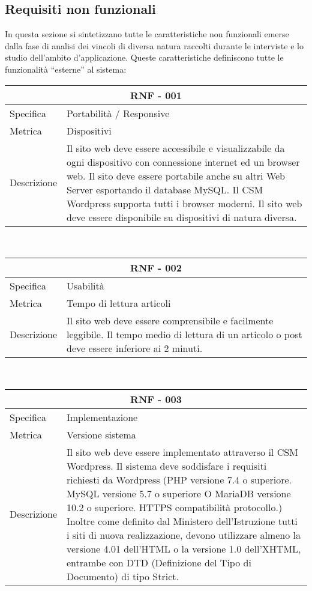 \documentclass{article}
\begin{document}
\subsection{\textbf{Requisiti non funzionali}}
In questa sezione si sintetizzano tutte le caratteristiche non funzionali emerse dalla fase di  analisi dei vincoli di diversa natura raccolti durante le interviste e lo studio dell'ambito d'applicazione. Queste caratteristiche definiscono tutte le funzionalità “esterne” al sistema:
\vspace{4mm} \vspace{4mm} 
\begin{tabular}{ |p{3cm}|p{8cm}|  }
	\hline
	\multicolumn{2}{|c|}{\textbf{RNF - 001}} \\
	\hline
	Specifica&Portabilità / Responsive\\
	\hline
	Metrica & Dispositivi\\
	\hline
	Descrizione&Il sito web deve essere accessibile e visualizzabile da ogni dispositivo con connessione internet ed un browser web. Il sito deve essere portabile anche su altri Web Server esportando il database MySQL. Il CSM Wordpress supporta tutti i browser moderni. Il sito web deve essere disponibile su dispositivi di natura diversa.\\
	\hline
\end{tabular}\\
\vspace{4mm} 
\begin{tabular}{ |p{3cm}|p{8cm}|  }
	\hline
	\multicolumn{2}{|c|}{\textbf{RNF - 002}} \\
	\hline
	Specifica&Usabilità \\
	\hline
	Metrica & Tempo di lettura articoli\\
	\hline
	Descrizione&Il sito web deve essere comprensibile e facilmente leggibile. Il tempo medio di lettura di un articolo o post deve essere inferiore ai 2 minuti.\\
	\hline
\end{tabular}\\
\vspace{4mm} 
\begin{tabular}{ |p{3cm}|p{8cm}|  }
	\hline
	\multicolumn{2}{|c|}{\textbf{RNF - 003}} \\
	\hline
	Specifica &Implementazione\\
	\hline
	Metrica &  Versione sistema\\
	\hline
	Descrizione&Il sito web deve essere implementato attraverso il CSM Wordpress. Il sistema deve soddisfare i requisiti richiesti da Wordpress (PHP versione 7.4 o superiore.
	MySQL versione 5.7 o superiore O MariaDB versione 10.2 o superiore.
	HTTPS compatibilità protocollo.) Inoltre come definito dal Ministero dell'Istruzione tutti i siti di nuova realizzazione, devono utilizzare almeno la versione 4.01 dell'HTML o la versione 1.0 dell'XHTML, entrambe con DTD (Definizione del Tipo di Documento) di tipo Strict.\\
	\hline
\end{tabular}\\
\end{document}
